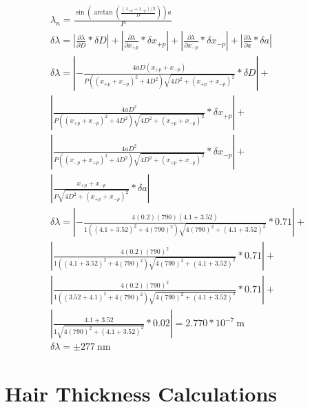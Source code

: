 \documentclass{report}
\begin{document}
$$
\begin{gathered}
    \lambda_n=\frac{\sin \left(\arctan \left( \frac{(x_{+p} + x_{-p})/2}{D} \right)\right)a}{P} \\
    \delta \lambda=\left|\frac{\partial \lambda}{\partial D} * \delta D\right|+\left|\frac{\partial \lambda}{\partial x_{+p}} * \delta x_{+p}\right|+ \left|\frac{\partial \lambda}{\partial x_{-p}} * \delta x_{-p}\right|+ \left|\frac{\partial \lambda}{\partial a} * \delta a\right|\\
    \delta \lambda=\left|-\frac{4aD\left(x_{+p}+x_{-p}\right)}{P\left(\left(x_{+p}+x_{-p}\right)^2+4D^2\right)\sqrt{4D^2+\left(x_{+p}+x_{-p}\right)^2}}* \delta D\right|+ \\
    \left|\frac{4aD^2}{P\left(\left(x_{+p}+x_{-p}\right)^2+4D^2\right)\sqrt{4D^2+\left(x_{+p}+x_{-p}\right)^2}} * \delta x_{+p}\right|+ \\ 
    \left|\frac{4aD^2}{P\left(\left(x_{-p}+x_{+p}\right)^2+4D^2\right)\sqrt{4D^2+\left(x_{+p}+x_{-p}\right)^2}} * \delta x_{-p}\right|+ \\
    \left|\frac{x_{+p}+x_{-p}}{P\sqrt{4D^2+\left(x_{+p}+x_{-p}\right)^2}} * \delta a\right|\\
%
    \delta \lambda=\left|-\frac{4(0.2)(790)\left(4.1+3.52\right)}{1\left(\left(4.1+3.52\right)^2+4(790)^2\right)\sqrt{4(790)^2+\left(4.1+3.52\right)^2}}* 0.71 \right|+ \\ \left|\frac{4(0.2)(790)^2}{1\left(\left(4.1+3.52\right)^2+4(790)^2\right)\sqrt{4(790)^2+\left(4.1+3.52\right)^2}} * 0.71\right|+ \\ \left|\frac{4(0.2)(790)^2}{1\left(\left(3.52+4.1\right)^2+4(790)^2\right)\sqrt{4(790)^2+\left(4.1+3.52\right)^2}} * 0.71\right|+ \\ \left|\frac{4.1+3.52}{1\sqrt{4(790)^2+\left(4.1+3.52\right)^2}} * 0.02\right| = 2.770 * 10^{-7} \ \mathrm{m} \\
    \delta \lambda = \pm 277 \ \mathrm{nm}
\end{gathered}
$$

\section{Hair Thickness Calculations}
\end{document}
